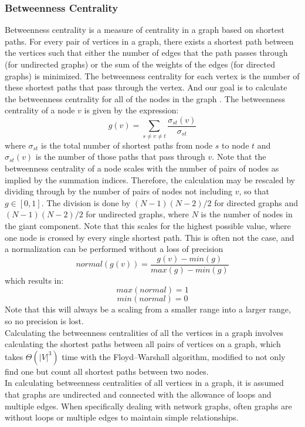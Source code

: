 \documentclass{article}
\begin{document}
\subsubsection{Betweenness Centrality}
Betweenness centrality is a measure of centrality in a graph based on shortest paths. For every pair of vertices in a graph, there exists a shortest path between the vertices such that either the number of edges that the path passes through (for undirected graphs) or the sum of the weights of the edges (for directed graphs) is minimized. The betweenness centrality for each vertex is the number of these shortest paths that pass through the vertex. And our goal is to calculate the betweenness centrality for all of the nodes in the graph \cite{cite:faster}.
The betweenness centrality of a node \mbox{\boldmath $v$} is given by the expression:
\[g(v) = \sum_{s\neq v\neq t}\frac{\sigma_{st}(v)}{\sigma_{st}}\]
where \mbox{\boldmath $\sigma_{st}$} is the total number of shortest paths from node \mbox{\boldmath $s$} to node \mbox{\boldmath $t$} and \mbox{\boldmath $\sigma_{st}(v)$} is the number of those paths that pass through \mbox{\boldmath $v$}.
Note that the betweenness centrality of a node scales with the number of pairs of nodes as implied by the summation indices. Therefore, the calculation may be rescaled by dividing through by the number of pairs of nodes not including \mbox{\boldmath $v$}, so that \mbox{\boldmath $g \in [0,1]$}. The division is done by \mbox{\boldmath $(N - 1)(N - 2)/2$} for directed graphs and \mbox{\boldmath $(N - 1)(N - 2)/2$} for undirected graphs, where \mbox{\boldmath $N$} is the number of nodes in the giant component. Note that this scales for the highest possible value, where one node is crossed by every single shortest path. This is often not the case, and a normalization can be performed without a loss of precision
\[normal(g(v)) = \frac{g(v) - min(g)}{max(g) - min(g)}\]
which results in:
\[max(normal) = 1\]
\[min(normal) = 0\]
Note that this will always be a scaling from a smaller range into a larger range, so no precision is lost.\\
Calculating the betweenness centralities of all the vertices in a graph involves calculating the shortest paths between all pairs of vertices on a graph, which takes ${\displaystyle \Theta (|V|^{3})}$ time with the Floyd–Warshall algorithm, modified to not only find one but count all shortest paths between two nodes.\\
In calculating betweenness centralities of all vertices in a graph, it is assumed that graphs are undirected and connected with the allowance of loops and multiple edges. When specifically dealing with network graphs, often graphs are without loops or multiple edges to maintain simple relationships.\\
\end{document}
